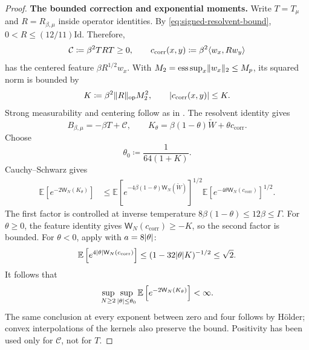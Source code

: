 \documentclass[11pt,reqno]{amsart}
\numberwithin{equation}{section}
\theoremstyle{plain}
\theoremstyle{remark}
\DeclarePairedDelimiter{\abs}{\lvert}{\rvert}
\DeclarePairedDelimiter{\norm}{\lVert}{\rVert}
\DeclarePairedDelimiter{\ipp}{\langle}{\rangle}
\newcommand{\E}{{\mathbb{E}}}
\newcommand{\tl}{\widetilde}
\newcommand{\be}{\beta}
\newcommand{\step}[1]{\par\medskip\noindent\textbf{#1}}
\begin{document}
\begin{proof}
\step{The bounded correction and exponential moments.}
Write $T=T_\mu$ and $R=R_{\be,\mu}$ inside operator identities.  By
\eqref{eq:signed-resolvent-bound}, $0<R\leq(12/11)\mathrm{Id}$.  Therefore,
\begin{equation}\label{quant-resp:eq-Ckernel}
 \mathcal C\coloneqq\be^2TRT\geq0,\qquad
 c_{\mathrm{corr}}(x,y)\coloneqq\be^2\ipp*{w_x,Rw_y}
\end{equation}
has the centered feature $\be R^{1/2}w_x$.  With
$M_2=\operatorname*{ess\,sup}_x\norm{w_x}_2\leq M_p$, its squared norm is
bounded by
\begin{equation}\label{eq:signed-correction-bound}
 K\coloneqq\be^2\norm R_{\mathrm{op}}M_2^2,
 \qquad \abs{c_{\mathrm{corr}}(x,y)}\leq K.
\end{equation}
Strong measurability and centering follow as in
.  The resolvent identity gives
\begin{equation}\label{quant-resp:eq-Bdecomposition}
 B_{\be,\mu}=-\be T+\mathcal C,
 \qquad K_\theta=\be(1-\theta)\tl W+\theta c_{\mathrm{corr}}.
\end{equation}
Choose
\begin{equation}\label{quant-resp:eq-theta0}
 \theta_0\coloneqq\frac1{64(1+K)}.
\end{equation}
Cauchy--Schwarz gives
\begin{align}
 \E\left[e^{-2\mathsf W_N(K_\theta)}\right]
 &\leq\E\left[e^{-4\be(1-\theta)\mathsf W_N(\tl W)}\right]^{1/2}
       \E\left[e^{-4\theta\mathsf W_N(c_{\mathrm{corr}})}\right]^{1/2}.
 \label{quant-resp:eq-responseholder}
\end{align}
The first factor is controlled at inverse temperature
$8\be(1-\theta)\leq12\be\leq\Gamma$.
For $\theta\geq0$, the feature identity gives
$\mathsf W_N(c_{\mathrm{corr}})\geq-K$, so the second factor is bounded.
For $\theta<0$, apply  with
$a=8\abs\theta$:
\begin{equation}\label{quant-resp:eq-attractivecorrection}
 \E\left[e^{4\abs\theta\mathsf W_N(c_{\mathrm{corr}})}\right]
 \leq(1-32\abs\theta K)^{-1/2}\leq\sqrt2.
\end{equation}
It follows that
\begin{equation}\label{quant-resp:eq-responseexp}
 \sup_{N\geq2}\sup_{\abs\theta\leq\theta_0}
       \E\left[e^{-2\mathsf W_N(K_\theta)}\right]<\infty.
\end{equation}
The same conclusion at every exponent between zero and four follows by
H\"older; convex interpolations of the kernels also preserve the bound.
Positivity has been used only for $\mathcal C$, not for $T$.


\end{proof}
\end{document}

